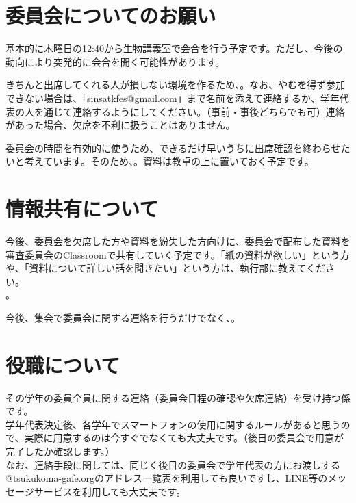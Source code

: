 \documentclass[paper=b4j, landscape, fleqn, jafontsize=8pt, jafontscale=1, head_space=25.5mm, foot_space=15mm, fore-edge=14.5mm, gutter=14.5mm, hanging_punctuation]{jlreq}
\begin{document}
\begin{normalmaterial}
\section{委員会についてのお願い}
基本的に木曜日の12:40から生物講義室で会合を行う予定です。ただし、今後の動向により突発的に会合を開く可能性があります。

きちんと出席してくれる人が損しない環境を作るため、。なお、やむを得ず参加できない場合は、「sinsatkfes@gmail.com」まで名前を添えて連絡するか、学年代表の人を通じて連絡するようにしてください。（事前・事後どちらでも可）連絡があった場合、欠席を不利に扱うことはありません。

委員会の時間を有効的に使うため、できるだけ早いうちに出席確認を終わらせたいと考えています。そのため、。資料は教卓の上に置いておく予定です。

\section{情報共有について}
今後、委員会を欠席した方や資料を紛失した方向けに、委員会で配布した資料を審査委員会のClassroomで共有していく予定です。「紙の資料が欲しい」という方や、「資料について詳しい話を聞きたい」という方は、執行部に教えてください。\\
。

今後、集会で委員会に関する連絡を行うだけでなく、。

\section{役職について}
その学年の委員全員に関する連絡（委員会日程の確認や欠席連絡）を受け持つ係です。\\
学年代表決定後、各学年でスマートフォンの使用に関するルールがあると思うので、実際に用意するのは今すぐでなくても大丈夫です。（後日の委員会で用意が完了したか確認します。）\\
なお、連絡手段に関しては、同じく後日の委員会で学年代表の方にお渡しする@tsukukoma-gafe.orgのアドレス一覧表を利用しても良いですし、LINE等のメッセージサービスを利用しても大丈夫です。


\end{normalmaterial}
\end{document}
